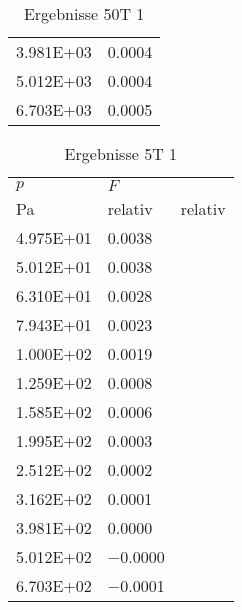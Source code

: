 \begin{table}
\begin{tabular}{l l }
\num{3.981E+03}&\num{0.0004}\\
\num{5.012E+03}&\num{0.0004}\\
\num{6.703E+03}&\num{0.0005}\\
\bottomrule
\end{tabular}\caption{Ergebnisse 50T 1}\end{table}\begin{table}\begin{tabular}{l l }
\toprule
$p$&$F$\\
 Pa & relativ & relativ\\\midrule
\num{4.975E+01}&\num{0.0038}\\
\num{5.012E+01}&\num{0.0038}\\
\num{6.310E+01}&\num{0.0028}\\
\num{7.943E+01}&\num{0.0023}\\
\num{1.000E+02}&\num{0.0019}\\
\num{1.259E+02}&\num{0.0008}\\
\num{1.585E+02}&\num{0.0006}\\
\num{1.995E+02}&\num{0.0003}\\
\num{2.512E+02}&\num{0.0002}\\
\num{3.162E+02}&\num{0.0001}\\
\num{3.981E+02}&\num{0.0000}\\
\num{5.012E+02}&\num{-0.0000}\\
\num{6.703E+02}&\num{-0.0001}\\
\bottomrule
\end{tabular}\caption{Ergebnisse 5T 1}\end{table}
